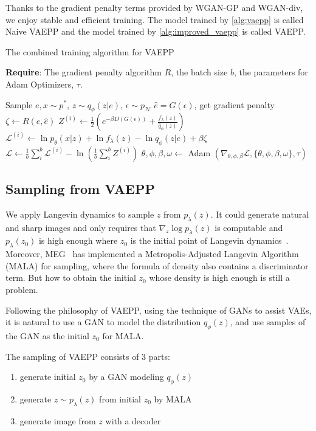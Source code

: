 Thanks to the gradient penalty terms provided by WGAN-GP and WGAN-div, we enjoy stable and efficient training. The model trained by \cref{alg:vaepp} is called Naive VAEPP and the model trained by \cref{alg:improved_vaepp} is called VAEPP. 
\begin{algorithm}[tb]
\caption{The combined training algorithm for VAEPP}
\label{alg:improved_vaepp}
\textbf{Require}: The gradient penalty algorithm $R$, the batch size $b$, the parameters for Adam Optimizers, $\tau$. 

\begin{algorithmic}[1] %
\STATE Sample $e, x \sim p^*$, $z \sim q_\phi(z|e)$, $\epsilon \sim p_\mathcal{N}$
\STATE $\hat{e} = G(\epsilon)$, get gradient penalty $\zeta \gets R(e, \hat{e})$ 
\STATE $Z^{(i)} \gets \frac{1}{2}(e^{-\beta D(G(\epsilon))} + \frac{f_\lambda(z)}{\hat{q}_\phi(z)})$
\STATE $\mathcal{L}^{(i)} \gets \ln p_\theta(x|z) + \ln f_\lambda(z) - \ln q_\phi(z|e) + \beta \zeta$
\ENDFOR
\STATE $\mathcal{L} \gets \frac{1}{b}\sum_{i}^b \mathcal{L}^{(i)} - \ln (\frac{1}{b}\sum_{i}^b Z^{(i)})$
\STATE $\theta, \phi, \beta, \omega \gets $ Adam $(\nabla_{\theta, \phi, \beta} \mathcal{L}, \{\theta, \phi, \beta, \omega\}, \tau)$
\ENDWHILE
\end{algorithmic}
\end{algorithm}

\subsection{Sampling from VAEPP}
We apply Langevin dynamics to sample $z$ from $p_\lambda(z)$. It could generate natural and sharp images and only requires that $\nabla_z \log p_\lambda(z)$ is computable and $p_\lambda(z_0)$ is high enough where $z_0$ is the initial point of Langevin dynamics~\cite{song2019generative}. 
Moreover, MEG~\cite{kumar2019maximum} has implemented a Metropolis-Adjusted Langevin Algorithm (MALA) for sampling, where the formula of density also contains a discriminator term. 
But how to obtain the initial $z_0$ whose density is high enough is still a problem. 

Following the philosophy of VAEPP, \IE using the technique of GANs to assist VAEs, it is natural to use a GAN to model the distribution $q_\phi(z)$, and use samples of the GAN as the initial $z_0$ for MALA. 

The sampling of VAEPP consists of 3 parts: 
\begin{enumerate}
	\item generate initial $z_0$ by a GAN modeling $q_\phi(z)$
	\item generate $z \sim p_\lambda(z)$ from initial $z_0$ by MALA
	\item generate image from $z$ with a decoder
\end{enumerate}

